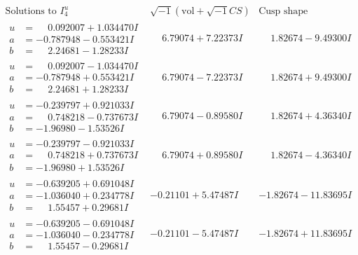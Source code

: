\documentclass[1p]{elsarticle_modified}
\theoremstyle{definition}
\newcommand{\I}{\sqrt{-1}}
\begin{document}
$$\begin{array}{c|c|c}  
\text{Solutions to }I^u_{4}& \I (\text{vol} + \sqrt{-1}CS) & \text{Cusp shape}\\
 \hline 
\begin{aligned}
u &= \phantom{-}0.092007 + 1.034470 I \\
a &= -0.787948 - 0.553421 I \\
b &= \phantom{-}2.24681 - 1.28233 I\end{aligned}
 & \phantom{-}6.79074 + 7.22373 I & \phantom{-}1.82674 - 9.49300 I \\ \hline\begin{aligned}
u &= \phantom{-}0.092007 - 1.034470 I \\
a &= -0.787948 + 0.553421 I \\
b &= \phantom{-}2.24681 + 1.28233 I\end{aligned}
 & \phantom{-}6.79074 - 7.22373 I & \phantom{-}1.82674 + 9.49300 I \\ \hline\begin{aligned}
u &= -0.239797 + 0.921033 I \\
a &= \phantom{-}0.748218 - 0.737673 I \\
b &= -1.96980 - 1.53526 I\end{aligned}
 & \phantom{-}6.79074 - 0.89580 I & \phantom{-}1.82674 + 4.36340 I \\ \hline\begin{aligned}
u &= -0.239797 - 0.921033 I \\
a &= \phantom{-}0.748218 + 0.737673 I \\
b &= -1.96980 + 1.53526 I\end{aligned}
 & \phantom{-}6.79074 + 0.89580 I & \phantom{-}1.82674 - 4.36340 I \\ \hline\begin{aligned}
u &= -0.639205 + 0.691048 I \\
a &= -1.036040 + 0.234778 I \\
b &= \phantom{-}1.55457 + 0.29681 I\end{aligned}
 & -0.21101 + 5.47487 I & -1.82674 - 11.83695 I \\ \hline\begin{aligned}
u &= -0.639205 - 0.691048 I \\
a &= -1.036040 - 0.234778 I \\
b &= \phantom{-}1.55457 - 0.29681 I\end{aligned}
 & -0.21101 - 5.47487 I & -1.82674 + 11.83695 I \\ \hline\begin{aligned}

\end{aligned}
\end{array}$$
\end{document}
